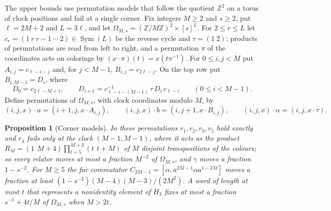\documentclass[11pt,a4paper]{article}
\theoremstyle{plain}
\newtheorem{proposition}[theorem]{Proposition}
\theoremstyle{definition}
\theoremstyle{remark}
\DeclareMathOperator{\Sym}{Sym}
\begin{document}
The upper bounds use permutation models that follow the quotient $\mathbb Z^2$ on a torus of clock positions and fail at a single
corner. Fix integers $M\ge2$ and $s\ge2$, put $\ell=2M+2$ and $L=3\ell$, and let $\Omega_{M,s}=(\mathbb Z/M\mathbb Z)^2\times[s]^L$.
For $2\le r\le L$ let $c_r=(1\ r\ r{-}1\ \cdots\ 2)\in\Sym(L)$ be the reverse cycle and $\tau=(1\ 2)$; products of permutations are read
from left to right, and a permutation $\pi$ of the coordinates acts on colorings by $(x\cdot\pi)(t)=x(t\pi^{-1})$. For $0\le i,j<M$ put
$A_{i,j}=c_{\ell-i-j}$ and, for $j<M-1$, $B_{i,j}=c_{2\ell-j}$. On the top row put $B_{i,M-1}=D_i$, where
\begin{equation}\label{eq:corner-rec}
D_0=c_{2\ell-M+1},\qquad D_{i+1}=c_{\ell-i-(M-1)}^{-1}\,\tau\,D_i\,c_{\ell-i}\qquad(0\le i<M-1).
\end{equation}
Define permutations of $\Omega_{M,s}$, with clock coordinates modulo $M$, by
\[
(i,j,x)\cdot a=(i+1,j,x\cdot A_{i,j}),\qquad(i,j,x)\cdot b=(i,j+1,x\cdot B_{i,j}),\qquad(i,j,x)\cdot\alpha=(i,j,x\cdot\tau).
\]

\begin{proposition}[Corner models]\label{prop:corner}
In these permutations $r_1,r_2,r_3,r_5$ hold exactly and $r_4$ fails only at the clock $(M-1,M-1)$, where it acts as the product
$R_M=(1\ \,M{+}4)\prod_{t=5}^{M+3}(t\ \,t{+}M)$ of $M$ disjoint transpositions of the colours; so every relator moves at most
a fraction $M^{-2}$ of $\Omega_{M,s}$, and $\gamma$ moves a fraction $1-s^{-2}$. For $M\ge5$ the far commutator
$C_{2M-1}=[\alpha,a^{2M-1}\alpha a^{1-2M}]$ moves a fraction at least $(1-s^{-2})(M-4)(M-3)/(2M^2)$. A word of length at most $t$ that
represents a nonidentity element of $H_3$ fixes at most a fraction $s^{-1}+4t/M$ of $\Omega_{M,s}$ when $M>2t$.
\end{proposition}
\end{document}
